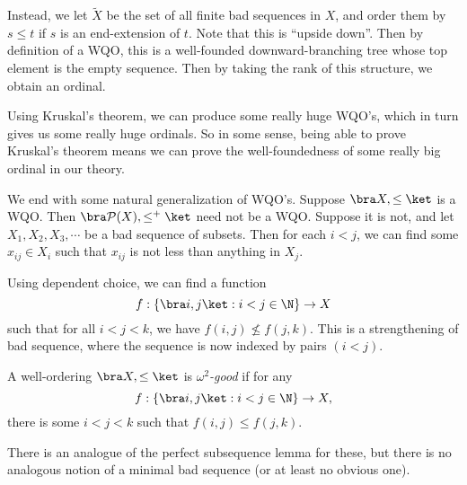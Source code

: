 \documentclass[a4paper]{article}
\begin{document}
Instead, we let $\tilde{X}$ be the set of all finite bad sequences in $X$, and order them by $s \leq t$ if $s$ is an end-extension of $t$. Note that this is ``upside down''. Then by definition of a WQO, this is a well-founded downward-branching tree whose top element is the empty sequence. Then by taking the rank of this structure, we obtain an ordinal.

Using Kruskal's theorem, we can produce some really huge WQO's, which in turn gives us some really huge ordinals. So in some sense, being able to prove Kruskal's theorem means we can prove the well-foundedness of some really big ordinal in our theory.

%
%
%
%

We end with some natural generalization of WQO's. Suppose $\bra X, \leq\ket$ is a WQO. Then $\bra \mathcal{P}(X), \leq^+\ket$ need not be a WQO. Suppose it is not, and let $X_1, X_2, X_3, \cdots$ be a bad sequence of subsets. Then for each $i < j$, we can find some $x_{ij} \in X_i$ such that $x_{ij}$ is not less than anything in $X_j$.

Using dependent choice, we can find a function
\[
  f: \{\bra i, j\ket: i < j \in \N\} \to X
\]
such that for all $i < j < k$, we have $f(i, j) \not\leq f(j, k)$. This is a strengthening of bad sequence, where the sequence is now indexed by pairs $(i < j)$.

\begin{defi}
  A well-ordering $\bra X, \leq\ket$ is \emph{$\omega^2$-good} if for any
  \[
    f: \{\bra i, j\ket: i < j \in \N\} \to X,
  \]
  there is some $i < j < k$ such that $f(i, j) \leq f(j, k)$.
\end{defi}
There is an analogue of the perfect subsequence lemma for these, but there is no analogous notion of a minimal bad sequence (or at least no obvious one).

\printindex
\end{document}
